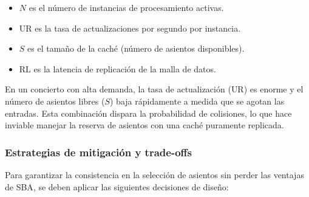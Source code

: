 \documentclass[12pt, a4paper]{article}
\begin{document}
    \begin{itemize}
    \item $N$ es el número de instancias de procesamiento activas.
    \item $\text{UR}$ es la tasa de actualizaciones por segundo por instancia.
    \item $S$ es el tamaño de la caché (número de asientos disponibles).
    \item $\text{RL}$ es la latencia de replicación de la malla de datos.
    \end{itemize}

    En un concierto con alta demanda, la tasa de actualización ($\text{UR}$) es enorme y el número de asientos libres ($S$) baja rápidamente a medida que se agotan las entradas. Esta combinación dispara la probabilidad de colisiones, lo que hace inviable manejar la reserva de asientos con una caché puramente replicada.
    \subsubsection{Estrategias de mitigación y trade-offs}


    Para garantizar la consistencia en la selección de asientos sin perder las ventajas de SBA, se deben aplicar las siguientes decisiones de diseño:
\end{document}
